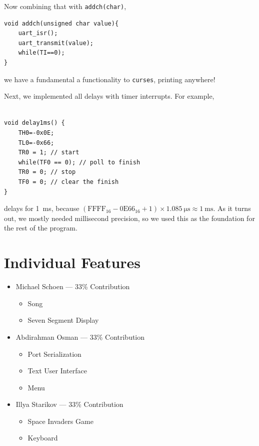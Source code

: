 \documentclass[12pt]{article}
\newcommand{\shellcmd}[1]{\texttt{\colorbox{gray!30}{#1}}}
\begin{document}
Now combining that with \shellcmd{addch(char)},

\begin{lstlisting}[style=cC]
void addch(unsigned char value){
	uart_isr();
	uart_transmit(value);
	while(TI==0);
}
\end{lstlisting}

\noindent we have a fundamental a functionality to \shellcmd{curses}, printing anywhere!

Next, we implemented all delays with timer interrupts. For example,

\begin{lstlisting}[style=cC]

void delay1ms() {
	TH0=-0x0E;
    TL0=-0x66;
	TR0 = 1; // start
	while(TF0 == 0); // poll to finish
	TR0 = 0; // stop
	TF0 = 0; // clear the finish
}
\end{lstlisting}

\noindent delays for \SI{1}{\milli\second}, because $(\text{FFFF}_{16} - \text{0E66}_{16} + 1)\times\SI{1.085}{\micro\second} \approx \SI{1}{\milli\second}$. As it turns out, we mostly needed millisecond precision, so we used this as the foundation for the rest of the program.

\section{Individual Features}
\begin{itemize}
    \item Michael Schoen --- 33\% Contribution
    \begin{itemize}
        \item Song
        \item Seven Segment Display
    \end{itemize}

    \item Abdirahman Osman --- 33\% Contribution
    \begin{itemize}
        \item Port Serialization
        \item Text User Interface
        \item Menu
    \end{itemize}

    \item Illya Starikov --- 33\% Contribution
    \begin{itemize}
        \item Space Invaders Game
        \item Keyboard
    \end{itemize}
\end{itemize}
\end{document}
